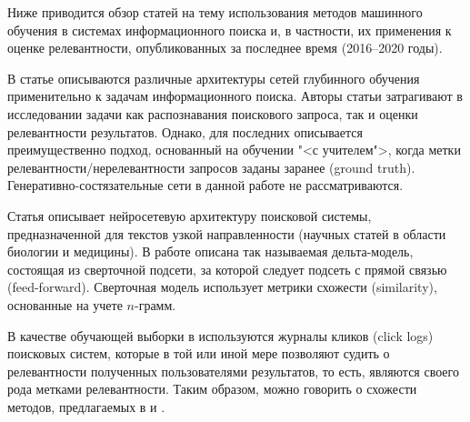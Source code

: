 \documentclass{article}
\begin{document}
Ниже приводится обзор статей на тему использования методов машинного обучения в системах информационного поиска и, в частности, 
их применения к оценке релевантности, опубликованных за последнее время (2016--2020 годы).

В статье \cite{DBLP:journals/corr/MitraC17} описываются различные архитектуры сетей глубинного обучения применительно к задачам
информационного поиска. Авторы статьи затрагивают в исследовании задачи как распознавания поискового запроса, так и оценки 
релевантности результатов. Однако, для последних описывается преимущественно подход, основанный на обучении "<с учителем">, когда
метки релевантности/нерелевантности запросов заданы заранее (ground truth). Генеративно-состя\-зательные сети в данной работе
не рассматриваются.

Статья \cite{DBLP:journals/corr/abs-1802-10078} описывает нейросетевую архитектуру поисковой системы, предназначенной для
текстов узкой направленности (научных статей в области биологии и медицины). В работе описана так называемая дельта-модель, 
состоящая из сверточной подсети, за которой следует подсеть с прямой связью (feed-forward). Сверточная модель использует метрики
схожести (similarity), основанные на учете $n$-грамм.

В качестве обучающей выборки в \cite{DBLP:journals/corr/abs-1802-10078} используются журналы кликов (click logs) поисковых систем, 
которые в той или иной мере позволяют судить о релевантности полученных пользователями результатов, то есть, являются своего рода
метками релевантности. Таким образом, можно говорить о схожести методов, предлагаемых в \cite{DBLP:journals/corr/MitraC17} и 
\cite{DBLP:journals/corr/abs-1802-10078}.

\printbibliography
\end{document}
